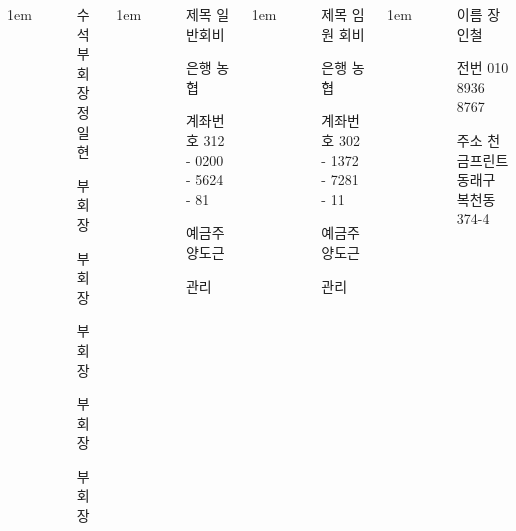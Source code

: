\documentclass[	25pt, 
							a0paper, 
							portrait, %
							margin=0mm, %
							innermargin=10mm,  		%
							blockverticalspace=4mm, %
							colspace=5mm, 
							subcolspace=0mm
							]{tikzposter}
\begin{document}
\begin{columns}
			{
					\setlength{\leftmargini}{9em}
					\setlength{\labelsep} {1em}
				\begin{LARGE}
					\begin{itemize}
					\item  [수석부회장] 정일현
					\item  [부회장] 
					\item  [부회장] 
					\item  [부회장] 
					\item  [부회장] 
					\item  [부회장] 

					\end{itemize}
				\end{LARGE}
			}


			{
					\setlength{\leftmargini}{8em}
					\setlength{\labelsep} {1em}
				\begin{LARGE}
					\begin{itemize}
					\item [제목] 일반회비
					\item [은행] 농협
					\item [계좌번호] 312 - 0200 - 5624 - 81
					\item [예금주] 양도근
					\item [관리]
					\end{itemize}
				\end{LARGE}
			}


			{
					\setlength{\leftmargini}{8em}
					\setlength{\labelsep} {1em}
				\begin{LARGE}
					\begin{itemize}
					\item [제목] 임원 회비
					\item [은행] 농협
					\item [계좌번호] 302 - 1372 - 7281 - 11
					\item [예금주] 양도근
					\item [관리]
					\end{itemize}
				\end{LARGE}
			}


			{
					\setlength{\leftmargini}{4em}
					\setlength{\labelsep} {1em}
				\begin{LARGE}
					\begin{itemize}
					\item [이름] 장인철
					\item [전번] 010 8936 8767
					\item [주소] 천금프린트 동래구 복천동 374-4
					\end{itemize}
				\end{LARGE}
			}




\end{columns}
\end{document}
